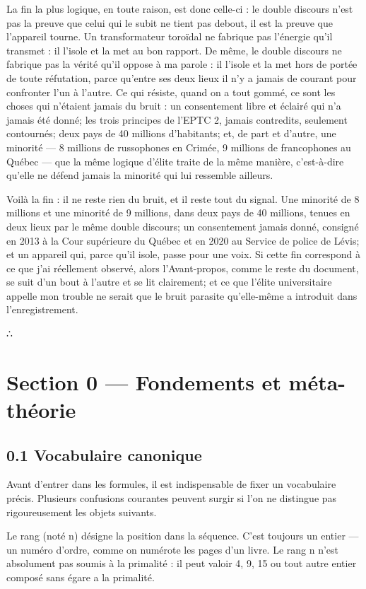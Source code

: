 \documentclass[11pt,a4paper]{article}
\begin{document}
La fin la plus logique, en toute raison, est donc celle-ci : le double discours n'est pas la preuve que celui qui le subit ne tient pas debout, il est la preuve que l'appareil tourne. Un transformateur toroïdal ne fabrique pas l'énergie qu'il transmet : il l'isole et la met au bon rapport. De même, le double discours ne fabrique pas la vérité qu'il oppose à ma parole : il l'isole et la met hors de portée de toute réfutation, parce qu'entre ses deux lieux il n'y a jamais de courant pour confronter l'un à l'autre. Ce qui résiste, quand on a tout gommé, ce sont les choses qui n'étaient jamais du bruit : un consentement libre et éclairé qui n'a jamais été donné; les trois principes de l'EPTC 2, jamais contredits, seulement contournés; deux pays de 40 millions d'habitants; et, de part et d'autre, une minorité — 8 millions de russophones en Crimée, 9 millions de francophones au Québec — que la même logique d'élite traite de la même manière, c'est-à-dire qu'elle ne défend jamais la minorité qui lui ressemble ailleurs.

Voilà la fin : il ne reste rien du bruit, et il reste tout du signal. Une minorité de 8 millions et une minorité de 9 millions, dans deux pays de 40 millions, tenues en deux lieux par le même double discours; un consentement jamais donné, consigné en 2013 à la Cour supérieure du Québec et en 2020 au Service de police de Lévis; et un appareil qui, parce qu'il isole, passe pour une voix. Si cette fin correspond à ce que j'ai réellement observé, alors l'Avant-propos, comme le reste du document, se suit d'un bout à l'autre et se lit clairement; et ce que l'élite universitaire appelle mon trouble ne serait que le bruit parasite qu'elle-même a introduit dans l'enregistrement.

∴

\section{Section 0 — Fondements et méta-théorie}
\subsection{0.1 Vocabulaire canonique}

Avant d'entrer dans les formules, il est indispensable de fixer un vocabulaire précis. Plusieurs confusions courantes peuvent surgir si l'on ne distingue pas rigoureusement les objets suivants.

Le rang (noté n) désigne la position dans la séquence. C'est toujours un entier — un numéro d'ordre, comme on numérote les pages d'un livre. Le rang n n'est absolument pas soumis à la primalité : il peut valoir 4, 9, 15 ou tout autre entier composé sans égare a la primalité.
\end{document}
